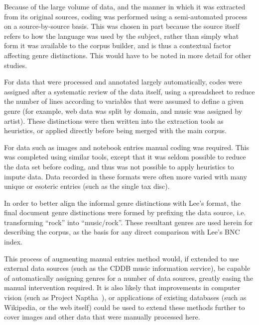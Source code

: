 Because of the large volume of data, and the manner in which it was extracted from its original sources, coding was performed using a semi-automated process on a source-by-source basis.  This was chosen in part because the source itself refers to how the language was used by the subject, rather than simply what form it was available to the corpus builder, and is thus a contextual factor affecting genre distinctions.  This would have to be noted in more detail for other studies.

For data that were processed and annotated largely automatically, codes were assigned after a systematic review of the data itself, using a spreadsheet to reduce the number of lines according to variables that were assumed to define a given genre (for example, web data was split by domain, and music was assigned by artist).  These distinctions were then written into the extraction tools as heuristics, or applied directly before being merged with the main corpus.

For data such as images and notebook entries manual coding was required.  This was completed using similar tools, except that it was seldom possible to reduce the data set before coding, and thus was not possible to apply heuristics to impute data.  Data recorded in these formats were often more varied with many unique or esoteric entries (such as the single tax disc).

In order to better align the informal genre distinctions with Lee's format, the final document genre distinctions were formed by prefixing the data source, i.e. transforming ``rock'' into ``music/rock''.  These resultant genres are used herein for describing the corpus, as the basis for any direct comparison with Lee's BNC index.




This process of augmenting manual entries method would, if extended to use external data sources (such as the CDDB music information service), be capable of automatically assigning genres for a number of data sources, greatly easing the manual intervention required.  It is also likely that improvements in computer vision (such as Project Naptha~\cite{naptha2014homepage}), or applications of existing databases (such as Wikipedia, or the web itself) could be used to extend these methods further to cover images and other data that were manually processed here.
